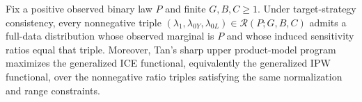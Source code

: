 Fix a positive observed binary law \(P\) and finite \(G,B,C\geq 1\). Under target-strategy consistency, every nonnegative triple \((\lambda_1,\lambda_{0Y},\lambda_{0L})\in\mathcal R(P;G,B,C)\) admits a full-data distribution whose observed marginal is \(P\) and whose induced sensitivity ratios equal that triple. Moreover, Tan's sharp upper product-model program maximizes the generalized ICE functional, equivalently the generalized IPW functional, over the nonnegative ratio triples satisfying the same normalization and range constraints.
